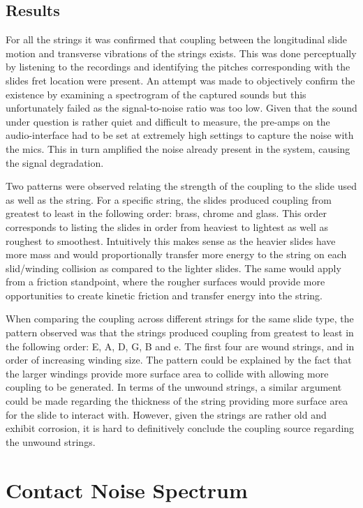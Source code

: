 \documentclass[../main.tex]{subfiles}
\begin{document}
\subsection{Results}
For all the strings it was confirmed that coupling between the longitudinal slide motion and transverse vibrations of the strings exists. This was done perceptually by listening to the recordings and identifying the pitches corresponding with the slides fret location were present. An attempt was made to objectively confirm the existence by examining a spectrogram of the captured sounds but this unfortunately failed as the signal-to-noise ratio was too low. Given that the sound under question is rather quiet and difficult to measure, the pre-amps on the audio-interface had to be set at extremely high settings to capture the noise with the mics. This in turn amplified the noise already present in the system, causing the signal degradation.

Two patterns were observed relating the strength of the coupling to the slide used as well as the string. For a specific string, the slides produced coupling from greatest to least in the following order: brass, chrome and glass. This order corresponds to listing the slides in order from heaviest to lightest as well as roughest to smoothest. Intuitively this makes sense as the heavier slides have more mass and would proportionally transfer more energy to the string on each slid/winding collision as compared to the lighter slides. The same would apply from a friction standpoint, where the rougher surfaces would provide more opportunities to create kinetic friction and transfer energy into the string.

When comparing the coupling across different strings for the same slide type, the pattern observed was that the strings produced coupling from greatest to least in the following order: E, A, D, G, B and e. The first four are wound strings, and in order of increasing winding size. The pattern could be explained by the fact that the larger windings provide more surface area to collide with allowing more coupling to be generated. In terms of the unwound strings, a similar argument could be made regarding the thickness of the string providing more surface area for the slide to interact with. However, given the strings are rather old and exhibit corrosion, it is hard to definitively conclude the coupling source regarding the unwound strings.

\section{Contact Noise Spectrum}
\end{document}
